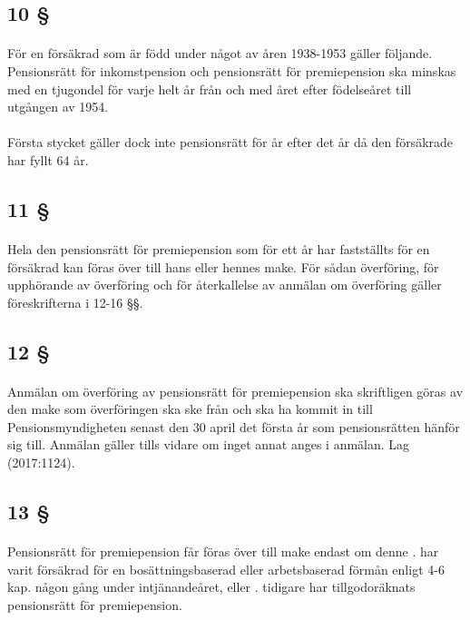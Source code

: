\documentclass[a4paper,notitlepage,openany,10pt]{book}
\begin{document}
\subsection*{10 §}
\paragraph*{}
För en försäkrad som är född under något av åren 1938-1953 gäller följande. Pensionsrätt för inkomstpension och pensionsrätt för premiepension ska minskas med en tjugondel för varje helt år från och med året efter födelseåret till utgången av 1954.
\paragraph*{}
Första stycket gäller dock inte pensionsrätt för år efter det år då den försäkrade har fyllt 64 år.
\subsection*{11 §}
\paragraph*{}
Hela den pensionsrätt för premiepension som för ett år har fastställts för en försäkrad kan föras över till hans eller hennes make. För sådan överföring, för upphörande av överföring och för återkallelse av anmälan om överföring gäller föreskrifterna i 12-16 §§.
\subsection*{12 §}
\paragraph*{}
Anmälan om överföring av pensionsrätt för premiepension ska skriftligen göras av den make som överföringen ska ske från och ska ha kommit in till Pensionsmyndigheten senast den 30 april det första år som pensionsrätten hänför sig till. Anmälan gäller tills vidare om inget annat anges i anmälan.
Lag (2017:1124).
\subsection*{13 §}
\paragraph*{}
Pensionsrätt för premiepension får föras över till make endast om denne
. har varit försäkrad för en bosättningsbaserad eller arbetsbaserad förmån enligt 4-6 kap. någon gång under intjänandeåret, eller
. tidigare har tillgodoräknats pensionsrätt för premiepension.
\end{document}
